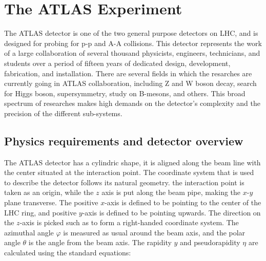 \chapter{The ATLAS Experiment}
\label{sec:ATLAS}

The ATLAS detector is one of the two general purpose detectors on LHC, and is designed for probing for p-p and A-A collisions.
This detector represents the work of a large collaboration of several thousand physicists, engineers, technicians,
and students over a period of fifteen years of dedicated design, development, fabrication, and installation.
There are several fields in which the resarches are currently going in ATLAS collaboration, including Z and W boson decay, search for Higgs boson,
supersymmetry, study on B-mesons, and others. This broad spectrum of researches makes high demands on the detector's complexity and the precision 
of the different sub-systems.

\section{Physics requirements and detector overview}
\label{sec:ATLAS_overview}
The ATLAS detector has a cylindric shape, it is aligned along the beam line with the center situated at the interaction point.
The coordinate system that is used to describe the detector follows its natural geometry. the interaction point is taken as an origin,
while the $z$ axis is put along the beam pipe, making the $x$-$y$ plane transverse. The positive $x$-axis is defined to be pointing to the center
of the LHC ring, and positive $y$-axis is defined to be pointing upwards. The direction on the $z$-axis is picked such as to form a right-handed coordinate system.
The azimuthal angle $\varphi$ is measured as usual around the beam axis, and the polar angle $\theta$ is the angle from the beam axis. The rapidity $y$ and pseudorapidity $\eta$
are calculated using the standard equations:



\begin{figure}
\end{figure}

